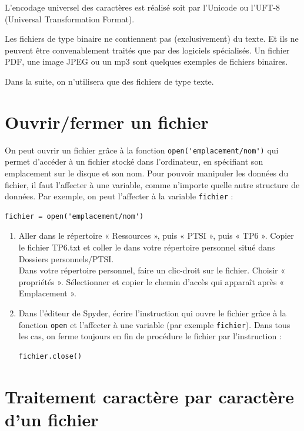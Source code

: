 L’encodage universel des caractères est réalisé soit par l’Unicode ou l’UFT-8 (Universal Transformation Format).

Les fichiers de type binaire ne contiennent pas (exclusivement) du texte. Et ils ne peuvent être convenablement traités que par des logiciels spécialisés. Un fichier PDF, une image JPEG ou un mp3 sont quelques exemples de fichiers binaires.

Dans la suite, on n’utilisera que des fichiers de type texte.

\section*{Ouvrir/fermer un fichier}

On peut ouvrir un fichier grâce à la fonction \verb|open('emplacement/nom')| qui permet d'accéder à un fichier stocké dans l'ordinateur, en spécifiant son emplacement sur le disque et son nom. Pour pouvoir manipuler les données du fichier, il faut l'affecter à une variable, comme n'importe quelle autre structure de données. Par exemple, on peut l'affecter à la variable \verb|fichier| :

\begin{verbatim}
fichier = open('emplacement/nom') 
\end{verbatim}

\begin{enumerate}
\item Aller dans le répertoire « Ressources », puis « PTSI », puis « TP6 ». Copier le fichier {\og}TP6.txt{\fg} et coller le dans votre répertoire personnel situé dans {\og}Dossiers personnels/PTSI{\fg}.\\
Dans votre répertoire personnel, faire un clic-droit sur le fichier. Choisir « propriétés ». Sélectionner et copier le chemin d'accès qui apparaît après « Emplacement ».

\item Dans l'éditeur de Spyder, écrire l'instruction qui ouvre le fichier grâce à la fonction \verb|open| et l'affecter à une variable (par exemple \verb|fichier|). Dans tous les cas, on ferme toujours en fin de procédure le fichier par l'instruction :
\begin{verbatim}
fichier.close() 
\end{verbatim}

\end{enumerate}

\section*{Traitement caractère par caractère d'un fichier}


